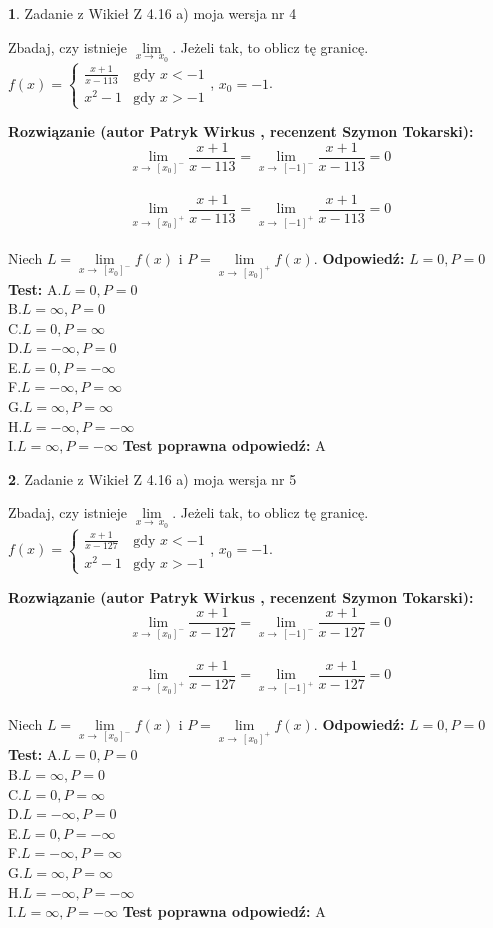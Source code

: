 \documentclass[12pt, a4paper]{article}
\theoremstyle{definition} %
\newtheorem{zad}{}
\newcommand{\zadStart}[1]{\begin{zad}#1\newline}
\newcommand{\zadStop}{\end{zad}}
\newcommand{\rozwStart}[2]{\noindent \textbf{Rozwiązanie (autor #1 , recenzent #2): }\newline}
\newcommand{\rozwStop}{\newline}
\newcommand{\odpStart}{\noindent \textbf{Odpowiedź:}\newline}
\newcommand{\odpStop}{\newline}
\newcommand{\testStart}{\noindent \textbf{Test:}\newline}
\newcommand{\testStop}{\newline}
\newcommand{\kluczStart}{\noindent \textbf{Test poprawna odpowiedź:}\newline}
\newcommand{\kluczStop}{\newline}
\begin{document}
\zadStart{Zadanie z Wikieł Z 4.16 a) moja wersja nr 4}

Zbadaj, czy istnieje $\lim\limits_{x\to\ x_{0}}$. Jeżeli tak, to oblicz tę granicę.\\   $f(x) = \left\{ \begin{array}{ll}
\frac{x+1}{x-113} & \textrm{gdy $x<-1$}\\
x^{2}-1 & \textrm{gdy $x>-1$}
\end{array} \right.$, $x_{0}=-1$.
\zadStop
\rozwStart{Patryk Wirkus}{Szymon Tokarski}
$$\lim\limits_{x\to\ [x_{0}]^{-}}\frac{x+1}{x-113} = \lim\limits_{x\to\ [-1]^{-}}\frac{x+1}{x-113} = 0$$
\\
$$\lim\limits_{x\to\ [x_{0}]^{+}}\frac{x+1}{x-113} = \lim\limits_{x\to\ [-1]^{+}}\frac{x+1}{x-113} = 0$$
\\
Niech $L=\lim\limits_{x\to\ [x_{0}]^{-}}f(x)$ i $P=\lim\limits_{x\to\ [x_{0}]^{+}}f(x)$.
\rozwStop
\odpStart
$L=0, P=0$
\odpStop
\testStart
A.$L=0, P=0$\\ B.$L=\infty, P=0$\\ C.$L=0, P=\infty$\\ D.$L=-\infty, P=0$\\ E.$L=0, P=-\infty$\\
F.$L=-\infty, P=\infty$\\ G.$L=\infty, P=\infty$\\
H.$L=-\infty, P=-\infty$\\
I.$L=\infty, P=-\infty$
\testStop
\kluczStart
A
\kluczStop



\zadStart{Zadanie z Wikieł Z 4.16 a) moja wersja nr 5}

Zbadaj, czy istnieje $\lim\limits_{x\to\ x_{0}}$. Jeżeli tak, to oblicz tę granicę.\\   $f(x) = \left\{ \begin{array}{ll}
\frac{x+1}{x-127} & \textrm{gdy $x<-1$}\\
x^{2}-1 & \textrm{gdy $x>-1$}
\end{array} \right.$, $x_{0}=-1$.
\zadStop
\rozwStart{Patryk Wirkus}{Szymon Tokarski}
$$\lim\limits_{x\to\ [x_{0}]^{-}}\frac{x+1}{x-127} = \lim\limits_{x\to\ [-1]^{-}}\frac{x+1}{x-127} = 0$$
\\
$$\lim\limits_{x\to\ [x_{0}]^{+}}\frac{x+1}{x-127} = \lim\limits_{x\to\ [-1]^{+}}\frac{x+1}{x-127} = 0$$
\\
Niech $L=\lim\limits_{x\to\ [x_{0}]^{-}}f(x)$ i $P=\lim\limits_{x\to\ [x_{0}]^{+}}f(x)$.
\rozwStop
\odpStart
$L=0, P=0$
\odpStop
\testStart
A.$L=0, P=0$\\ B.$L=\infty, P=0$\\ C.$L=0, P=\infty$\\ D.$L=-\infty, P=0$\\ E.$L=0, P=-\infty$\\
F.$L=-\infty, P=\infty$\\ G.$L=\infty, P=\infty$\\
H.$L=-\infty, P=-\infty$\\
I.$L=\infty, P=-\infty$
\testStop
\kluczStart
A
\kluczStop
\end{document}
